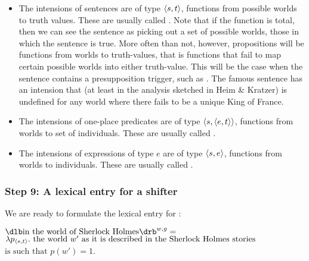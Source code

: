 \enlargethispage{24pt}
\begin{itemize}
\item The intensions of sentences are of type $\langle s,t \rangle$, functions from
  possible worlds to truth values. These are usually called .
  Note that if the function is total, then we can see the sentence as picking
  out a set of possible worlds, those in which the sentence is true. More often
  than not, however, propositions will be  functions from worlds
  to truth-values, that is functions that fail to map certain possible worlds
  into either truth-value. This will be the case when the sentence contains a
  presupposition trigger, such as . The famous sentence
   has an intension that (at least in the
  analysis sketched in Heim \& Kratzer) is undefined for any world where
  there fails to be a unique King of France.
\item The intensions of one-place predicates are of type
  $\langle s,\langle e,t \rangle \rangle$, functions from worlds to set of individuals. These
  are usually called .
\item The intensions of expressions of type $e$ are of type $\langle s,e \rangle$,
  functions from worlds to individuals. These are usually called
  .
\end{itemize}


\subsubsection{Step 9: A lexical entry for a shifter}
\label{sec:lexic-entry-expr}

We are ready to formulate the lexical entry for :

\ex $\svt{in the world of Sherlock Holmes}^{w,g} =$\\
$\lambda p_{\langle s,t \rangle}.\ \mbox{the world } w'
\mbox{ as it is described in the Sherlock Holmes stories}$\\
$\mbox{is such that } p(w') = 1$. \xe

